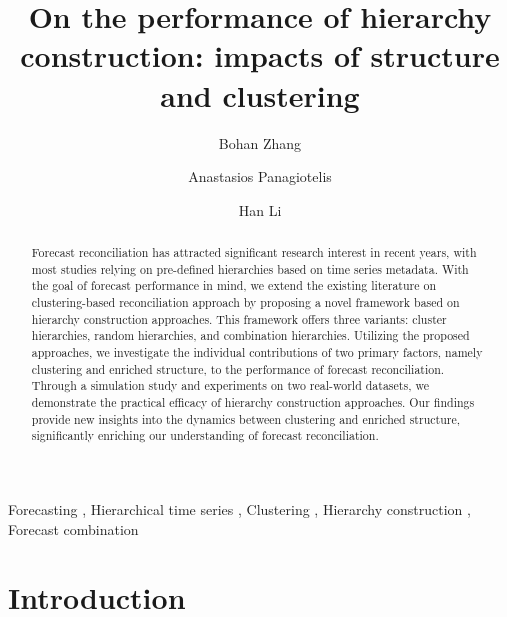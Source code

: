 \documentclass[a4paper,review,12pt,authoryear]{elsarticle}
\begin{document}
\begin{frontmatter}

  \title{On the performance of hierarchy construction: impacts of structure and clustering}

  \author[label1]{Bohan Zhang}
  \address[label1]{School of Economics and Management, Beihang University, Beijing, China}
  \author[label2]{Anastasios Panagiotelis}
  \address[label2]{The University of Sydney Business School, NSW 2006, Australia}
  \author[label3]{Han Li}
  \address[label3]{Centre for Actuarial Studies, Department of Economics, The University of Melbourne, Australia}

  \begin{abstract}

    Forecast reconciliation has attracted significant research interest in recent years, with most studies relying on pre-defined hierarchies based on time series metadata. With the goal of forecast performance in mind, we extend the existing literature on clustering-based reconciliation approach by proposing a novel framework based on hierarchy construction approaches. This framework offers three variants: cluster hierarchies, random hierarchies, and combination hierarchies. Utilizing the proposed approaches, we investigate the individual contributions of two primary factors, namely clustering and enriched structure, to the performance of forecast reconciliation.  Through a simulation study and experiments on two real-world datasets, we demonstrate the practical efficacy of hierarchy construction approaches. Our findings provide new insights into the dynamics between clustering and enriched structure, significantly enriching our understanding of forecast reconciliation.

  \end{abstract}

  \begin{keyword}
  Forecasting \sep
  Hierarchical time series \sep
  Clustering \sep
  Hierarchy construction \sep
  Forecast combination
  \end{keyword}

\end{frontmatter}

\newpage

\section{Introduction}
\end{document}
